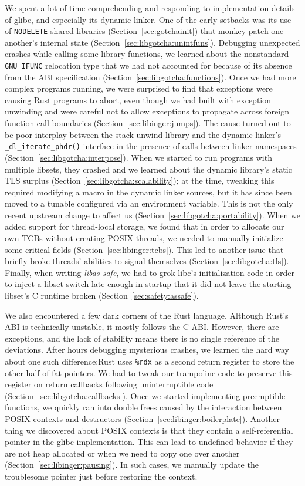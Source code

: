 We spent a lot of time comprehending and responding to implementation details of
glibc, and especially its dynamic linker.  One of the early setbacks was its use of
\texttt{NODELETE} shared libraries (Section~\ref{sec:gotchainit}) that monkey patch
one another's internal state (Section~\ref{sec:libgotcha:unintfuns}).  Debugging
unexpected crashes while calling some library functions, we learned about the
nonstandard \texttt{GNU\_IFUNC} relocation type that we had not accounted for because
of its absence from the ABI specification (Section~\ref{sec:libgotcha:functions}).
Once we had more complex programs running, we were surprised to find that exceptions
were causing Rust programs to abort, even though we had built with exception
unwinding and were careful not to allow exceptions to propagate across foreign
function call boundaries (Section~\ref{sec:libinger:jumps}).  The cause turned out
to be poor interplay between the stack unwind library and the dynamic linker's
\texttt{\_dl\_iterate\_phdr()} interface in the presence of calls between linker
namespaces (Section~\ref{sec:libgotcha:interpose}).  When we started to run programs
with multiple libsets, they crashed and we learned about the dynamic library's static
TLS surplus (Section~\ref{sec:libgotcha:scalability}); at the time, tweaking this
required modifying a macro in the dynamic linker sources, but it has since been moved
to a tunable configured via an environment variable.  This is not the only recent
upstream change to affect us (Section~\ref{sec:libgotcha:portability}).  When we
added support for thread-local storage, we found that in order to allocate our own
TCBs without creating POSIX threads, we needed to manually initialize some critical
fields (Section~\ref{sec:libinger:tcbs}).  This led to another issue that briefly
broke threads' abilities to signal themselves (Section~\ref{sec:libgotcha:tls}).
Finally, when writing \textit{libas-safe}, we had to grok libc's initialization code
in order to inject a libset switch late enough in startup that it did not leave the
starting libset's C runtime broken (Section~\ref{sec:safety:assafe}).

We also encountered a few dark corners of the Rust language.  Although Rust's ABI is
technically unstable, it mostly follows the C ABI.  However, there are exceptions,
and the lack of stability means there is no single reference of the deviations.
After hours debugging mysterious crashes, we learned the hard way about one such
difference:\@ Rust uses \texttt{\%rdx} as a second return register to store the other
half of fat pointers.  We had to tweak our trampoline code to preserve this register
on return callbacks following uninterruptible code
(Section~\ref{sec:libgotcha:callbacks}).  Once we started implementing preemptible
functions, we quickly ran into double frees caused by the interaction between POSIX
contexts and destructors (Section~\ref{sec:libinger:boilerplate}).  Another thing we
discovered about POSIX contexts is that they contain a self-referential pointer in
the glibc implementation.  This can lead to undefined behavior if they are not heap
allocated or when we need to copy one over another
(Section~\ref{sec:libinger:pausing}).  In such cases, we manually update the
troublesome pointer just before restoring the context.

